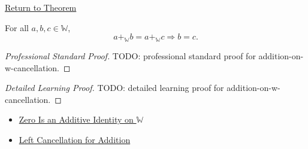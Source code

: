 \newpage
{}
\label{prf:addition-on-w-cancellation}

\begin{remark*}[Return]
\hyperref[thm:addition-on-w-cancellation]{Return to Theorem}
\end{remark*}

\begin{theorem*}
For all $a,b,c\in\mathbb{W}$,
\[
a+_{\mathbb{W}}b=a+_{\mathbb{W}}c\Longrightarrow b=c.
\]
\end{theorem*}

\begin{proof}[Professional Standard Proof]
\LRAProofBodyStart
TODO: professional standard proof for addition-on-w-cancellation.
\end{proof}

\begin{proof}[Detailed Learning Proof]
\LRAProofBodyStart
TODO: detailed learning proof for addition-on-w-cancellation.
\end{proof}

\begin{remark*}
\end{remark*}

\begin{dependencies}
\begin{itemize}
  \item \hyperref[thm:zero-additive-identity-on-w]{Zero Is an Additive Identity on $\mathbb{W}$}
  \item \hyperref[thm:addition-left-cancellation]{Left Cancellation for Addition}
\end{itemize}
\end{dependencies}

\clearpage
